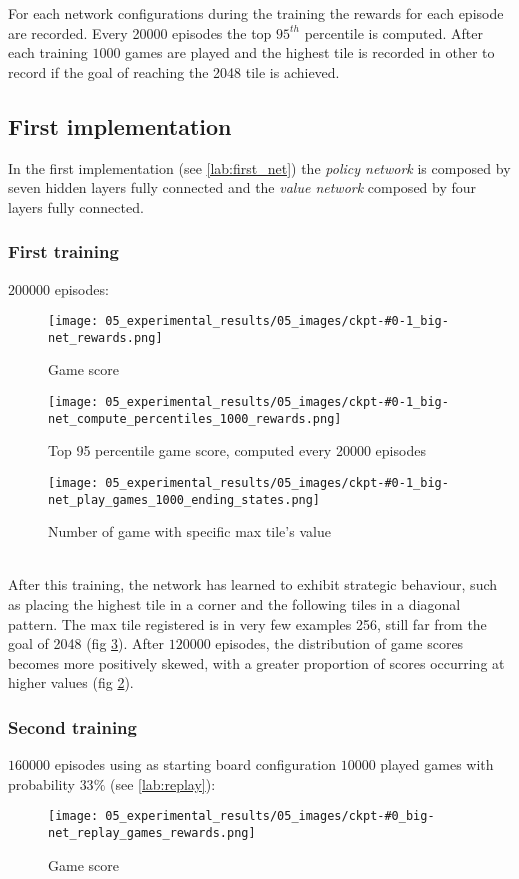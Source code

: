 For each network configurations during the training the rewards for each episode are recorded. Every 20000 episodes the top $95^{th}$ percentile is computed.
After each training $1000$ games are played and the highest tile is recorded in other to record if the goal of reaching the 2048 tile is achieved.

\subsection{First implementation}
In the first implementation (see \ref{lab:first_net}) the \textit{policy network} is composed by seven hidden layers fully connected and the \textit{value network} composed by four layers fully connected.
\subsubsection{First training}
$200000$ episodes:
\begin{figure}[htbp]
\centerline{\texttt{[image: 05\_experimental\_results/05\_images/ckpt-\#0-1\_big-net\_rewards.png]}}
\caption{Game score}
\label{fig:0-1_reward}
\end{figure}

\begin{figure}[htbp]
\centerline{\texttt{[image: 05\_experimental\_results/05\_images/ckpt-\#0-1\_big-net\_compute\_percentiles\_1000\_rewards.png]}}
\caption{Top 95 percentile game score, computed every 20000 episodes}
\label{fig:0-1_percentile}
\end{figure}

\begin{figure}[htbp]
\centerline{\texttt{[image: 05\_experimental\_results/05\_images/ckpt-\#0-1\_big-net\_play\_games\_1000\_ending\_states.png]}}
\caption{Number of game with specific max tile's value}
\label{fig:0-1_end_state}
\end{figure}

\\
After this training, the network has learned to exhibit strategic behaviour, such as placing the highest tile in a corner and the following tiles in a diagonal pattern.
The max tile registered is in very few examples 256, still far from the goal of 2048 (fig \ref{fig:0-1_end_state}).
After $120000$ episodes, the distribution of game scores becomes more positively skewed, with a greater proportion of scores occurring at higher values (fig \ref{fig:0-1_percentile}).

\subsubsection{Second training}
$160000$ episodes using as starting board configuration $10000$ played games with probability $33\%$ (see \ref{lab:replay}):
\begin{figure}[htbp]
\centerline{\texttt{[image: 05\_experimental\_results/05\_images/ckpt-\#0\_big-net\_replay\_games\_rewards.png]}}
\caption{Game score}
\label{fig:0-2_reward}
\end{figure}


